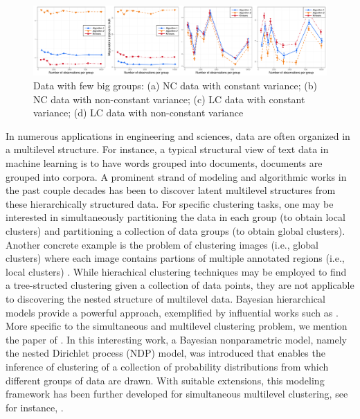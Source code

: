 \begin{figure}[ht]
\centerline{\includegraphics[width=0.9 \textwidth]{N_compare.pdf}}
\caption{Data with few big groups: (a) NC data with constant variance; (b) NC data with non-constant variance; (c) LC
data with constant variance; (d) LC data with non-constant variance}
\label{fig:simul_N}
\end{figure}

In numerous applications in engineering and sciences, data are often organized in
a multilevel structure. For instance, a typical structural view of text data in machine learning
is to have words grouped into documents, documents are grouped into 
corpora. A prominent strand of modeling and algorithmic works in the past couple decades
has been to discover latent multilevel structures from these hierarchically structured data. 
For specific clustering tasks, one may be interested in simultaneously partitioning the data in each 
group (to obtain local clusters) and partitioning a collection of data groups (to obtain global clusters). 
Another concrete example is the problem of clustering images (i.e., global clusters) where each image 
contains partions of multiple annotated regions (i.e., local clusters) \citep{Oliva-2001}. 
While hierachical clustering techniques may be employed to find a tree-structed clustering 
given a collection of data points, they are not applicable to discovering the nested structure of multilevel data.
Bayesian hierarchical models provide a powerful approach, exemplified by influential works such as
\cite{Blei-etal-03,Pritchard-etal-00,Teh-etal-06}. More specific to the simultaneous and multilevel
clustering problem, we mention the paper of \cite{Rodriguez-etal-08}. In this interesting work,
a Bayesian nonparametric model, namely the nested Dirichlet process (NDP) model,
was introduced that enables
the inference of clustering of a collection of probability distributions from which different 
groups of data are drawn. With suitable extensions, this modeling framework
has been further developed for simultaneous multilevel clustering, see for instance, 
\citep{Wulsin-2016,Vu-2014,Viet-2016}. 

